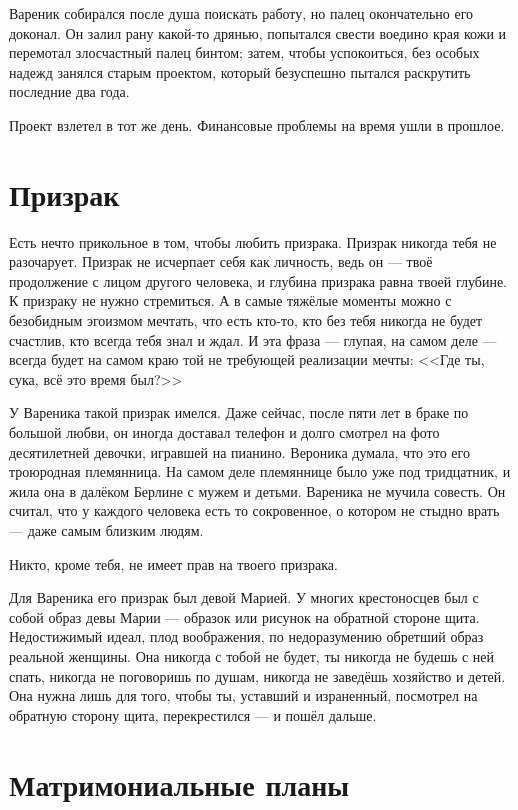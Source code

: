 \documentclass[a4paper,10pt,fleqn]{book}\usepackage{polyglossia}\setdefaultlanguage{english}\setotherlanguage{russian}\defaultfontfeatures{Ligatures=TeX,Mapping=tex-text} \usepackage{xcolor}\definecolor{lightgray}{HTML}{bbbbbb}\color{lightgray}\newcommand{\ml}[3]{\textcolor{black}{#3}}
\begin{document}
Вареник собирался после душа поискать работу, но палец окончательно его доконал.
Он залил рану какой-то дрянью, попытался свести воедино края кожи и перемотал злосчастный палец бинтом;
затем, чтобы успокоиться, без особых надежд занялся старым проектом, который безуспешно пытался раскрутить последние два года.

Проект взлетел в тот же день.
Финансовые проблемы на время ушли в прошлое.

\section{Призрак}

Есть нечто прикольное в том, чтобы любить призрака.
Призрак никогда тебя не разочарует.
Призрак не исчерпает себя как личность, ведь он --- твоё продолжение с лицом другого человека, и глубина призрака равна твоей глубине.
К призраку не нужно стремиться.
А в самые тяжёлые моменты можно с безобидным эгоизмом мечтать, что есть кто-то, кто без тебя никогда не будет счастлив, кто всегда тебя знал и ждал.
И эта фраза --- глупая, на самом деле --- всегда будет на самом краю той не требующей реализации мечты: <<Где ты, сука, всё это время был?>>

У Вареника такой призрак имелся.
Даже сейчас, после пяти лет в браке по большой любви, он иногда доставал телефон и долго смотрел на фото десятилетней девочки, игравшей на пианино.
Вероника думала, что это его троюродная племянница.
На самом деле племяннице было уже под тридцатник, и жила она в далёком Берлине с мужем и детьми.
Вареника не мучила совесть.
Он считал, что у каждого человека есть то сокровенное, о котором не стыдно врать --- даже самым близким людям.

Никто, кроме тебя, не имеет прав на твоего призрака.

Для Вареника его призрак был девой Марией.
У многих крестоносцев был с собой образ девы Марии --- образок или рисунок на обратной стороне щита.
Недостижимый идеал, плод воображения, по недоразумению обретший образ реальной женщины.
Она никогда с тобой не будет, ты никогда не будешь с ней спать, никогда не поговоришь по душам, никогда не заведёшь хозяйство и детей.
Она нужна лишь для того, чтобы ты, уставший и израненный, посмотрел на обратную сторону щита, перекрестился --- и пошёл дальше.

\section{Матримониальные планы}
\end{document}
